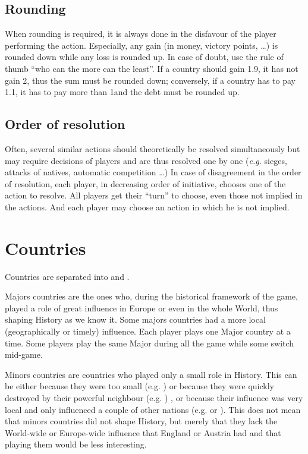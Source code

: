\subsection{Rounding}

\aparag When rounding is required, it is always done in the disfavour of the
player performing the action.
\bparag Especially, any gain (in money, victory points, \ldots) is rounded
down while any loss is rounded up.
\bparag In case of doubt, use the rule of thumb ``who can the more can the
least''. If a country should gain 1.9\ducats, it has not gain 2\ducats, thus
the sum must be rounded down; conversely, if a country has to pay 1.1\ducats,
it has to pay more than 1\ducats and the debt must be rounded up.

\subsection{Order of resolution}
\aparag Often, several similar actions should theoretically be resolved
simultaneously but may require decisions of players and are thus resolved one
by one (\emph{e.g.} sieges, attacks of natives, automatic competition \ldots)
\bparag In case of disagreement in the order of resolution, each player, in
decreasing order of initiative, chooses one of the action to resolve.
\bparag All players get their ``turn'' to choose, even those not implied in
the actions. And each player may choose an action in which he is not implied.

\section{Countries}

 Countries are separated into  and .

\aparag Majors countries are the ones who, during the historical framework of
the game, played a role of great influence in Europe or even in the whole
World, thus shaping History as we know it.
\bparag Some majors countries had a more local (geographically or timely)
influence.
\bparag Each player plays one Major country at a time. Some players play the
same Major during all the game while some switch mid-game.

\aparag Minors countries are countries who played only a small role in
History.
\bparag This can be either because they were too small (e.g. \paysCologne) or
because they were quickly destroyed by their powerful neighbour
(e.g. \paysDamas) , or because their influence was very local and only
influenced a couple of other nations (e.g. \paysPerse or \paysEcosse).
\bparag This does not mean that minors countries did not shape History, but
merely that they lack the World-wide or Europe-wide influence that England or
Austria had and that playing them would be less interesting.

